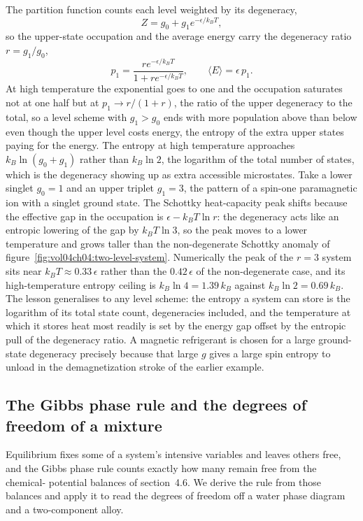 The partition function counts each level weighted by its degeneracy,
\[
Z = g_0 + g_1 e^{-\epsilon/k_B T},
\]
so the upper-state occupation and the average energy carry the degeneracy ratio
$r = g_1/g_0$,
\[
p_1 = \frac{r e^{-\epsilon/k_B T}}{1 + r e^{-\epsilon/k_B T}},
\qquad
\langle E\rangle = \epsilon\,p_1.
\]
At high temperature the exponential goes to one and the occupation saturates not at
one half but at $p_1 \to r/(1+r)$, the ratio of the upper degeneracy to the total,
so a level scheme with $g_1 > g_0$ ends with more population above than below even
though the upper level costs energy, the entropy of the extra upper states paying
for the energy. The entropy at high temperature approaches $k_B\ln(g_0 + g_1)$
rather than $k_B\ln 2$, the logarithm of the total number of states, which is the
degeneracy showing up as extra accessible microstates. Take a lower singlet
$g_0 = 1$ and an upper triplet $g_1 = 3$, the pattern of a spin-one paramagnetic
ion with a singlet ground state. The Schottky heat-capacity peak shifts because the
effective gap in the occupation is $\epsilon - k_B T\ln r$: the degeneracy acts like
an entropic lowering of the gap by $k_B T\ln 3$, so the peak moves to a lower
temperature and grows taller than the non-degenerate Schottky anomaly of
figure~\ref{fig:vol04ch04:two-level-system}. Numerically the peak of the $r = 3$
system sits near $k_B T \approx 0.33\,\epsilon$ rather than the $0.42\,\epsilon$ of
the non-degenerate case, and its high-temperature entropy ceiling is $k_B\ln 4 =
1.39\,k_B$ against $k_B\ln 2 = 0.69\,k_B$. The lesson generalises to any level
scheme: the entropy a system can store is the logarithm of its total state count,
degeneracies included, and the temperature at which it stores heat most readily is
set by the energy gap offset by the entropic pull of the degeneracy ratio. A
magnetic refrigerant is chosen for a large ground-state degeneracy precisely because
that large $g$ gives a large spin entropy to unload in the demagnetization stroke of
the earlier example.

\subsection{The Gibbs phase rule and the degrees of freedom of a mixture}

Equilibrium fixes some of a system's intensive variables and leaves others free,
and the Gibbs phase rule counts exactly how many remain free from the chemical-
potential balances of section~4.6. We derive the rule from those balances and apply
it to read the degrees of freedom off a water phase diagram and a two-component
alloy.

